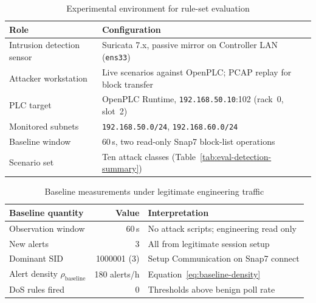 
\begin{table}[H]
    \centering
    \footnotesize
    \begin{tabular}{|l|l|}
        \hline
        \textbf{Role} & \textbf{Configuration} \\
        \hline
        Intrusion detection sensor & Suricata 7.x, passive mirror on Controller LAN (\texttt{ens33}) \\
        Attacker workstation & Live scenarios against OpenPLC; PCAP replay for block transfer \\
        PLC target & OpenPLC Runtime, \texttt{192.168.50.10}:102 (rack~0, slot~2) \\
        Monitored subnets & \texttt{192.168.50.0/24}, \texttt{192.168.60.0/24} \\
        Baseline window & 60\,s, two read-only Snap7 block-list operations \\
        Scenario set & Ten attack classes (Table~\ref{tab:eval-detection-summary}) \\
        \hline
    \end{tabular}
    \caption{Experimental environment for rule-set evaluation}
    \label{tab:eval-lab-setup}
\end{table}

\begin{table}[H]
    \centering
    \footnotesize
    \begin{tabular}{|l|r|l|}
        \hline
        \textbf{Baseline quantity} & \textbf{Value} & \textbf{Interpretation} \\
        \hline
        Observation window & 60\,s & No attack scripts; engineering read only \\
        New alerts & 3 & All from legitimate session setup \\
        Dominant SID & 1000001 (3) & Setup Communication on Snap7 connect \\
        Alert density $\rho_{\mathrm{baseline}}$ & 180 alerts/h & Equation~\eqref{eq:baseline-density} \\
        DoS rules fired & 0 & Thresholds above benign poll rate \\
        \hline
    \end{tabular}
    \caption{Baseline measurements under legitimate engineering traffic}
    \label{tab:eval-baseline}
\end{table}


